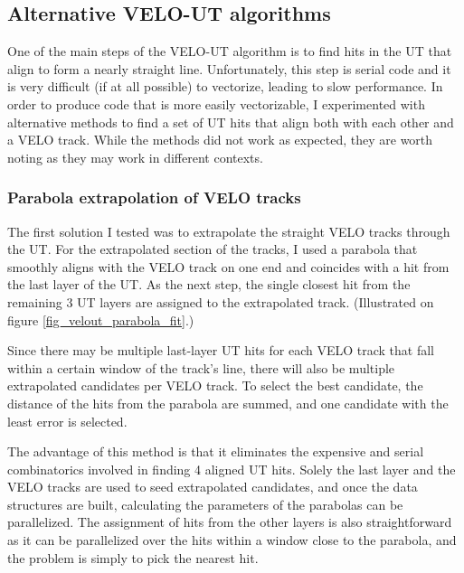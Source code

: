 \documentclass[12pt]{article}
\begin{document}
\subsection{Alternative VELO-UT algorithms}\label{sec_velout_alternative}

One of the main steps of the VELO-UT algorithm is to find hits in the UT that align to form a nearly straight line. Unfortunately, this step is serial code and it is very difficult (if at all possible) to vectorize, leading to slow performance. In order to produce code that is more easily vectorizable, I experimented with alternative methods to find a set of UT hits that align both with each other and a VELO track. While the methods did not work as expected, they are worth noting as they may work in different contexts.

\subsubsection{Parabola extrapolation of VELO tracks}

The first solution I tested was to extrapolate the straight VELO tracks through the UT. For the extrapolated section of the tracks, I used a parabola that smoothly aligns with the VELO track on one end and coincides with a hit from the last layer of the UT. As the next step, the single closest hit from the remaining 3 UT layers are assigned to the extrapolated track. (Illustrated on figure \ref{fig_velout_parabola_fit}.)

Since there may be multiple last-layer UT hits for each VELO track that fall within a certain window of the track's line, there will also be multiple extrapolated candidates per VELO track. To select the best candidate, the distance of the hits from the parabola are summed, and one candidate with the least error is selected.

The advantage of this method is that it eliminates the expensive and serial combinatorics involved in finding 4 aligned UT hits. Solely the last layer and the VELO tracks are used to seed extrapolated candidates, and once the data structures are built, calculating the parameters of the parabolas can be parallelized. The assignment of hits from the other layers is also straightforward as it can be parallelized over the hits within a window close to the parabola, and the problem is simply to pick the nearest hit.
\end{document}
